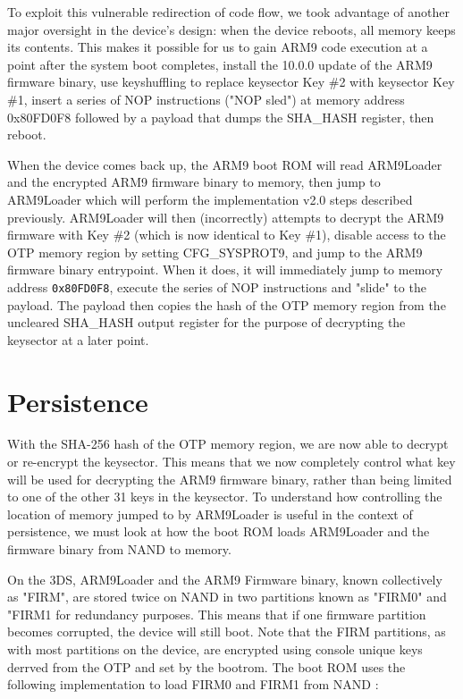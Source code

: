 \documentclass[journal]{IEEEtran}
\begin{document}
To exploit this vulnerable redirection of code flow, we took advantage of
another major oversight in the device's design: when the device reboots, all
memory keeps its contents. This makes it possible for us to gain ARM9 code
execution at a point after the system boot completes, install the 10.0.0 update
of the ARM9 firmware binary, use keyshuffling to replace keysector Key \#2 with
keysector Key \#1, insert a series of NOP instructions ("NOP sled") at memory
address 0x80FD0F8 followed by a payload that dumps the SHA\_HASH register, then
reboot.

When the device comes back up, the ARM9 boot ROM will read ARM9Loader and the
encrypted ARM9 firmware binary to memory, then jump to ARM9Loader which will
perform the implementation v2.0 steps described previously. ARM9Loader will then
(incorrectly) attempts to decrypt the ARM9 firmware with Key \#2 (which is now
identical to Key \#1), disable access to the OTP memory region by setting
CFG\_SYSPROT9, and jump to the ARM9 firmware binary entrypoint. When it does, it
will immediately jump to memory address \texttt{0x80FD0F8}, execute the series
of NOP instructions and "slide" to the payload. The payload then copies the
hash of the OTP memory region from the uncleared SHA\_HASH output register for
the purpose of decrypting the keysector at a later point.

\section{Persistence}

With the SHA-256 hash of the OTP memory region, we are now able to decrypt or
re-encrypt the keysector. This means that we now completely control what key
will be used for decrypting the ARM9 firmware binary, rather than being limited
to one of the other 31 keys in the keysector. To understand how controlling the
location of memory jumped to by ARM9Loader is useful in the context of
persistence, we must look at how the boot ROM loads ARM9Loader and the firmware
binary from NAND to memory.

On the 3DS, ARM9Loader and the ARM9 Firmware binary, known collectively as
"FIRM", are stored twice on NAND in two partitions known as "FIRM0" and "FIRM1
for redundancy purposes. This means that if one firmware partition becomes
corrupted, the device will still boot. Note that the FIRM partitions, as with
most partitions on the device, are encrypted using console unique keys derrved
from the OTP and set by the bootrom. The boot ROM uses the following
implementation to load FIRM0 and FIRM1 from NAND
\cite{clevermind}\cite{Bootloader}\cite{OTP_Registers}:
\end{document}
